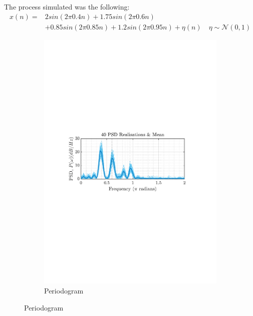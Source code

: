 \documentclass[12pt]{article}
\numberwithin{equation}{section}
\begin{document}
	The process simulated was the following:
	\begin{equation}
		\begin{aligned}
		x(n) = & 2 sin(2 \pi 0.4 n) + 1.75 sin(2 \pi 0.6 n) \\
		&  + 0.85 sin(2 \pi 0.85 n) + 1.2 sin(2 \pi 0.95 n) + \eta(n) \quad \eta \sim \mathcal{N}(0, 1)
		\end{aligned}
	\end{equation}
	
	

	\begin{figure}[H]
		\centering
		\begin{subfigure}{0.49\textwidth}
			\centering
			\includegraphics[trim={2.2cm 11.2cm 3.15cm  11.2cm}, clip, width=\textwidth]{../MATLAB/figures/q1_3b_fig01.pdf} 
			\captionsetup{justification=centering}
			\caption{Periodogram}
		\end{subfigure}

\end{figure}
\end{document}
